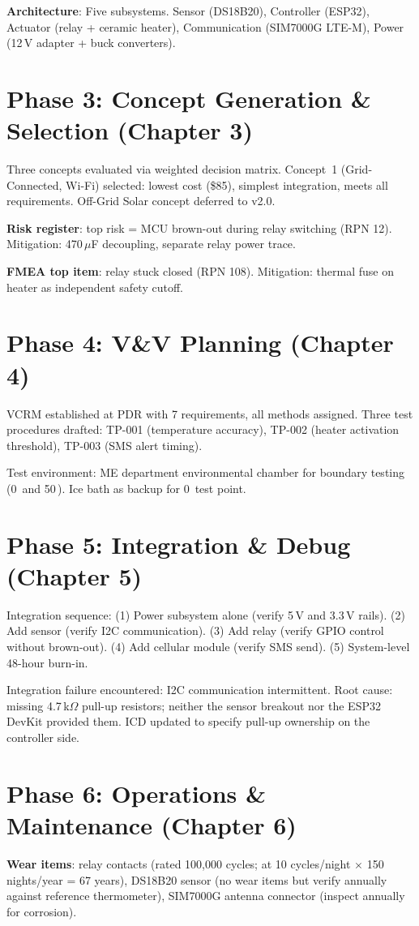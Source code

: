 \textbf{Architecture}: Five subsystems. Sensor (DS18B20), Controller (ESP32), Actuator (relay + ceramic heater), Communication (SIM7000G LTE-M), Power (12\,V adapter + buck converters).

\section*{Phase 3: Concept Generation \& Selection (Chapter 3)}
Three concepts evaluated via weighted decision matrix. Concept~1 (Grid-Connected, Wi-Fi) selected: lowest cost (\$85), simplest integration, meets all requirements. Off-Grid Solar concept deferred to v2.0.

\textbf{Risk register}: top risk = MCU brown-out during relay switching (RPN 12). Mitigation: 470\,$\mu$F decoupling, separate relay power trace.

\textbf{FMEA top item}: relay stuck closed (RPN 108). Mitigation: thermal fuse on heater as independent safety cutoff.

\section*{Phase 4: V\&V Planning (Chapter 4)}
VCRM established at PDR with 7 requirements, all methods assigned. Three test procedures drafted: TP-001 (temperature accuracy), TP-002 (heater activation threshold), TP-003 (SMS alert timing).

Test environment: ME department environmental chamber for boundary testing (0\,\degC{} and 50\,\degC{}). Ice bath as backup for 0\,\degC{} test point.

\section*{Phase 5: Integration \& Debug (Chapter 5)}
Integration sequence: (1) Power subsystem alone (verify 5\,V and 3.3\,V rails). (2) Add sensor (verify I2C communication). (3) Add relay (verify GPIO control without brown-out). (4) Add cellular module (verify SMS send). (5) System-level 48-hour burn-in.

Integration failure encountered: I2C communication intermittent. Root cause: missing 4.7\,k$\Omega$ pull-up resistors; neither the sensor breakout nor the ESP32 DevKit provided them. ICD updated to specify pull-up ownership on the controller side.

\section*{Phase 6: Operations \& Maintenance (Chapter 6)}
\textbf{Wear items}: relay contacts (rated 100,000 cycles; at 10 cycles/night $\times$ 150 nights/year = 67 years), DS18B20 sensor (no wear items but verify annually against reference thermometer), SIM7000G antenna connector (inspect annually for corrosion).

